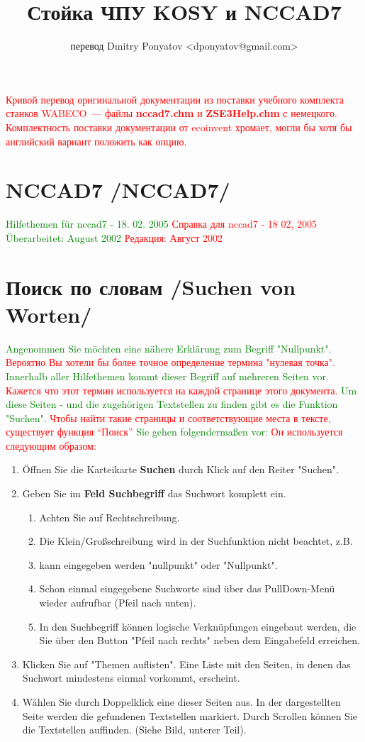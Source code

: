 \documentclass[14pt,a4paper]{book}
\title{Стойка ЧПУ KOSY и NCCAD7}
\author{перевод Dmitry Ponyatov <dponyatov@gmail.com>}
\newcommand{\DE}[1]{\textcolor{green}{#1}}
\newcommand{\RU}[1]{\textcolor{red}{#1}}
\newcommand{\TRpart}[2]{\chapter{#2 /#1/}}
\newcommand{\TRchapter}[2]{\chapter{#2 /#1/}}
\newcommand{\file}[1]{\textbf{#1}}
\begin{document}
\maketitle

\RU{Кривой перевод оригинальной документации из поставки учебного комплекта станков
WABECO~--- файлы \file{nccad7.chm} и \file{ZSE3Help.chm} с немецкого.
Комплектность поставки документации от ecoinvent хромает, могли бы хотя бы
английский вариант положить как опцию.}

\tableofcontents

\TRpart{NCCAD7}{NCCAD7}

\DE{Hilfethemen für nccad7 - 18. 02. 2005}
\RU{Справка для nccad7 - 18 02, 2005}
\DE{Überarbeitet: August 2002}
\RU{Редакция: Август 2002}

\TRchapter{Suchen von Worten}{Поиск по словам}

\bigskip 

\DE{Angenommen Sie möchten eine nähere Erklärung zum Begriff "Nullpunkt".}
\RU{Вероятно Вы хотели бы более точное определение термина
"нулевая точка".}
\DE{Innerhalb aller Hilfethemen kommt dieser Begriff auf mehreren Seiten vor.}
\RU{Кажется что этот термин используется на каждой странице этого
документа.}
\DE{Um diese Seiten - und die zugehörigen Textstellen zu finden gibt es die
Funktion "Suchen".}
\RU{Чтобы найти такие страницы и соответствующие места в тексте,
существует функция ``Поиск''}
\DE{Sie gehen folgendermaßen vor:}
\RU{Он используется следующим образом:}
\begin{enumerate}
  \item Öffnen Sie die Karteikarte \textbf{Suchen} durch Klick auf den Reiter
  "Suchen".
  \item Geben Sie im \textbf{Feld Suchbegriff} das Suchwort komplett ein. 
\begin{enumerate}
  \item Achten Sie auf Rechtschreibung. 
  \item Die Klein/Großschreibung wird in der Suchfunktion nicht beachtet, z.B.
  \item kann eingegeben werden "nullpunkt" oder "Nullpunkt".
  \item Schon einmal eingegebene Suchworte sind über das PullDown-Menü wieder
  aufrufbar (Pfeil nach unten).
  \item In den Suchbegriff können logische Verknüpfungen eingebaut werden, die
Sie über den Button "Pfeil nach rechts" neben dem Eingabefeld erreichen.
\end{enumerate}
  \item Klicken Sie auf "Themen auflisten". Eine Liste mit den Seiten, in denen
das Suchwort mindestens einmal vorkommt, erscheint.
  \item Wählen Sie durch Doppelklick eine dieser Seiten aus. In der
dargestellten Seite werden die gefundenen Textstellen markiert. Durch Scrollen können
 Sie die Textstellen auffinden. (Siehe Bild, unterer Teil).
\end{enumerate}
\end{document}
